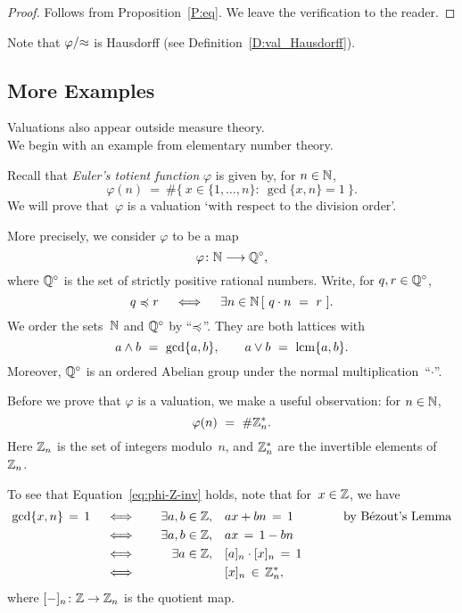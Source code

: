 \documentclass[main.tex]{subfiles}
\begin{document}
\begin{proof}
Follows from Proposition~\ref{P:eq}.
We leave the verification to the reader.
\end{proof}
\begin{rem}
Note that $\varphi/{\approx}$ is Hausdorff 
(see Definition~\ref{D:val_Hausdorff}).
\end{rem}
%

\subsection{More Examples}
\label{SS:more_examples}
%
%
\noindent
Valuations also appear outside measure theory.\\
We begin with an example from elementary number theory.
\begin{ex}
Recall that \emph{Euler's totient function}
$\varphi$
is given by,
for $n\in \mathbb{N}$,
\begin{equation*}
\varphi(n) \ =\ \#\{ \  x\in \{1,\dotsc,n\}\colon \ \gcd\{x,n\}=1\ \}.
\end{equation*}
We will prove that~$\varphi$
is a valuation `with respect to the division order'.

More precisely,
we consider $\varphi$ to be a map
\begin{equation*}
\varphi\colon \mathbb{N} \longrightarrow  \mathbb{Q}^\circ,
\end{equation*}
where $\mathbb{Q}^\circ$
is the set of strictly positive rational numbers.
Write, for $q,r\in\mathbb{Q}^\circ$,
\begin{equation*}
q\preccurlyeq r \quad\iff\quad \exists n\in\mathbb{N}\, [\ q \cdot n \ =\  r\ ].
\end{equation*}
We order the sets~$\mathbb{N}$ and $\mathbb{Q}^\circ$ by ``$\preccurlyeq$''.
They are both lattices with
\begin{equation*}
a\wedge b \ =\ \gcd\{a,b\},\qquad a \vee b \ =\ \lcm\{a,b\}.
\end{equation*}
Moreover,
$\mathbb{Q}^\circ$
is an ordered Abelian group under the normal multiplication~``$\cdot$''.

Before we prove that $\varphi$ is a valuation,
we make a useful observation: for $n\in\mathbb{N}$,
\begin{equation}
\label{eq:phi-Z-inv}
\varphi(n) \ =\ \# \mathbb{Z}_{n}^*.
\end{equation}
Here $\mathbb{Z}_{n}$ is the set of integers modulo~$n$,
and $\mathbb{Z}_{n}^*$
are the invertible elements of~$\mathbb{Z}_{n}$.

To see that Equation~\eqref{eq:phi-Z-inv} holds,
note that for~$x\in \mathbb{Z}$, we have
\begin{alignat*}{3}
\gcd\{x,n\}\,=\,1
\quad&\iff&\quad
\exists a,b\in\mathbb{Z},& \quad ax + bn \,=\,1  
\qquad&& \text{by B\'ezout's Lemma}\\
\quad&\iff&\quad
\exists a,b\in\mathbb{Z},& \quad ax  \,=\,1 - bn 
\qquad&& \\
\quad&\iff&\quad
\exists a\in\mathbb{Z},& \quad [a]_n\cdot[x]_n \,=\,1 \  
\qquad&& \\
\quad&\iff&\quad
& \quad [x]_n \,\in\, \mathbb{Z}_{n}^*,
\qquad&& 
\end{alignat*}
where $[-]_n\colon \mathbb{Z} \rightarrow \mathbb{Z}_{n}$
is the quotient map.


\end{ex}
\end{document}
